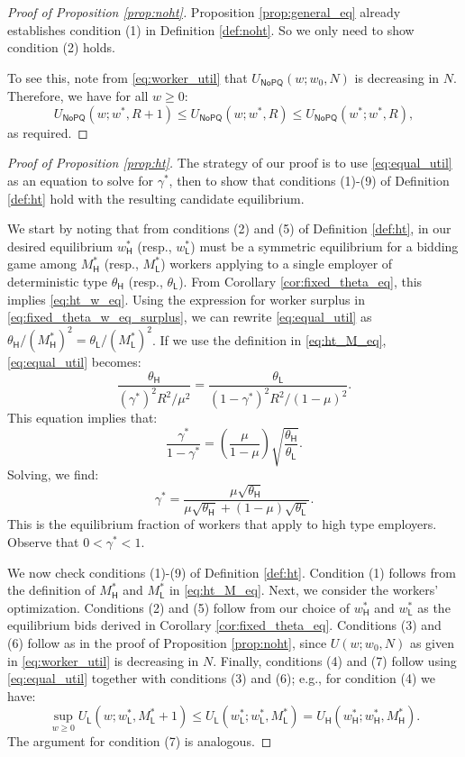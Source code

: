 \documentclass[11pt]{article}
\renewcommand{\H}{\ensuremath{\mathsf{H}}}
\renewcommand{\L}{\ensuremath{\mathsf{L}}}
\newcommand{\NoHT}{\ensuremath{\mathsf{NoPQ}}}
\begin{document}
\begin{proof}[Proof of Proposition \ref{prop:noht}]
Proposition \ref{prop:general_eq} already establishes condition (1) in Definition \ref{def:noht}.
So we only need to show condition (2) holds.  

To see this, note from \eqref{eq:worker_util} that $U_{\NoHT}(w; w_0, N)$ is decreasing in $N$.
Therefore, we have for all $w \geq 0$:
\[ U_{\NoHT}(w ; w^*, R+1) \leq U_{\NoHT}(w ; w^*, R) \leq U_{\NoHT}(w^*; w^*, R), \]
as required.
\end{proof}

\begin{proof}[Proof of Proposition \ref{prop:ht}]
The strategy of our proof is to use \eqref{eq:equal_util} as an equation to solve for $\gamma^*$, then to show that conditions (1)-(9) of Definition \ref{def:ht} hold with the resulting candidate equilibrium.

We start by noting that from conditions (2) and (5) of Definition \ref{def:ht},
in our desired equilibrium $w_\H^*$ (resp., $w_\L^*$) must be a symmetric equilibrium for a bidding game among $M_\H^*$  (resp., $M_\L^*$) workers applying to a single employer of deterministic type $\theta_\H$ (resp., $\theta_\L$).
From Corollary \ref{cor:fixed_theta_eq}, this implies \eqref{eq:ht_w_eq}.
Using the expression for worker surplus in \eqref{eq:fixed_theta_w_eq_surplus}, we can rewrite \eqref{eq:equal_util} as $\theta_\H/(M_\H^*)^2 = \theta_\L/(M_\L^*)^2$.
If we use the definition in \eqref{eq:ht_M_eq}, \eqref{eq:equal_util} becomes:
\begin{equation}
\label{eq:equal_util2}
\frac{\theta_\H}{(\gamma^*)^2 R^2/\mu^2} = \frac{\theta_\L}{(1-\gamma^*)^2R^2/(1-\mu)^2}.
\end{equation}
This equation implies that:
\begin{equation}
\label{eq:ratio_of_numapps}
 \frac{\gamma^*}{1-\gamma^*} = \left( \frac{\mu}{1-\mu}\right) \sqrt{\frac{\theta_\H}{\theta_\L}}.
\end{equation}
Solving, we find:
\[ \gamma^* = \frac{\mu\sqrt{\theta_\H}}{\mu\sqrt{\theta_\H} + (1-\mu)\sqrt{\theta_\L}}. \]
This is the equilibrium fraction of workers that apply to high type employers.
Observe that $0 < \gamma^* < 1$.

We now check conditions (1)-(9) of Definition \ref{def:ht}.
Condition (1) follows from the definition of $M_\H^*$ and $M_\L^*$ in \eqref{eq:ht_M_eq}.
Next, we consider the workers' optimization.
Conditions (2) and (5) follow from our choice of $w_\H^*$ and $w_\L^*$ as the equilibrium bids derived in Corollary \ref{cor:fixed_theta_eq}.
Conditions (3) and (6) follow as in the proof of Proposition \ref{prop:noht}, since $U(w ; w_0, N)$ as given in \eqref{eq:worker_util} is decreasing in $N$.
Finally, conditions (4) and (7) follow using \eqref{eq:equal_util} together with conditions (3) and (6); e.g., for condition (4) we have:
\[  \sup_{w \geq 0} U_\L(w ; w_\L^*, M_\L^* + 1) \leq U_{\L}(w_\L^* ; w_\L^*, M_\L^*) = U_{\H}(w_\H^* ; w_\H^*, M_\H^*). \]
The argument for condition (7) is analogous.


\end{proof}
\end{document}
